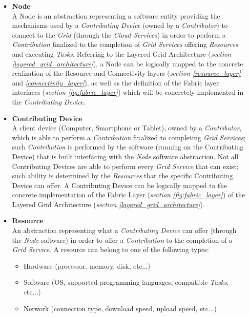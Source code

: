 \begin{itemize}
    \item \textbf{Node}\label{node}\\
    A Node is an abstraction representing a software entity providing the mechanisms used by a \textit{Contributing Device} (owned by a \textit{Contributor}) to connect to the \textit{Grid} (through the \textit{Cloud Services}) in order to perform a \textit{Contribution} finalized to the completion of \textit{Grid Services} offering \textit{Resources} and executing \textit{Tasks}. Referring to the Layered Grid Architecture (\textit{section \ref{layered_grid_architecture}}), a Node can be logically mapped to the concrete realization of the Resource and Connectivity layers (\textit{section \ref{resource_layer}} and \textit{\ref{connectivity_layer}}), as well as the definition of the Fabric layer interfaces (\textit{section \ref{fig:fabric_layer}}) which will be concretely implemented in the \textit{Contributing Device}.
    \item \textbf{Contributing Device}\label{contributing_device}\\
    A client device (Computer, Smartphone or Tablet), owned by a \textit{Contributor}, which is able to perform a \textit{Contribution} finalized to completing \textit{Grid Services}; such \textit{Contribution} is performed by the software (running on the Contributing Device) that is built interfacing with the \textit{Node} software abstraction. Not all Contributing Devices are able to perform every \textit{Grid Service} that can exist; such ability is determined by the \textit{Resources} that the specific Contributing Device can offer. A Contributing Device can be logically mapped to the concrete implementation of the Fabric Layer (\textit{section \ref{fig:fabric_layer}}) of the Layered Grid Architecture (\textit{section \ref{layered_grid_architecture}}).
    \item \textbf{Resource}\label{resource}\\
    An abstraction representing what a \textit{Contributing Device} can offer (through the \textit{Node} software) in order to offer a \textit{Contribution} to the completion of a \textit{Grid Service}. A resource can belong to one of the following types:
    \begin{itemize}
        \item Hardware (processor, memory, disk, etc...)
        \item Software (OS, supported programming languages, compatible \textit{Tasks}, etc...)
        \item Network (connection type, download speed, upload speed, etc...)

\end{itemize}
\end{itemize}
